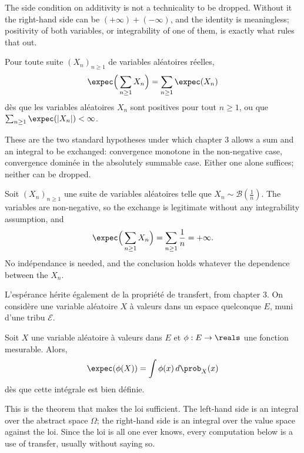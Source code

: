 The side condition on additivity is not a technicality to be dropped. Without it
the right-hand side can be $(+\infty) + (-\infty)$, and the identity is
meaningless; positivity of both variables, or integrability of one of them, is
exactly what rules that out.

\begin{prop}
  Pour toute suite $(X_{n})_{n \geq 1}$ de variables aléatoires réelles,
  \[
    \expec\Big(\sum_{n \geq 1} X_{n}\Big) = \sum_{n \geq 1} \expec(X_{n})
  \]
  dès que les variables aléatoires $X_{n}$ sont positives pour tout $n \geq 1$,
  ou que $\sum_{n \geq 1} \expec(|X_{n}|) < \infty$.
\end{prop}

\begin{remark}
  These are the two standard hypotheses under which chapter 3 allows a sum and an
  integral to be exchanged: convergence monotone in the non-negative case,
  convergence dominée in the absolutely summable case. Either one alone
  suffices; neither can be dropped.
\end{remark}

\begin{example}
  Soit $(X_{n})_{n \geq 1}$ une suite de variables aléatoires telle que
  $X_{n} \sim \mathcal{B}(\tfrac1n)$. The variables are non-negative, so the
  exchange is legitimate without any integrability assumption, and
  \[
    \expec\Big(\sum_{n \geq 1} X_{n}\Big)
      = \sum_{n \geq 1} \frac{1}{n} = +\infty .
  \]
  No indépendance is needed, and the conclusion holds whatever the dependence
  between the $X_{n}$.
\end{example}

L'espérance hérite également de la propriété de transfert, from chapter 3. On
considère une variable aléatoire $X$ à valeurs dans un espace quelconque $E$,
muni d'une tribu $\mathcal{E}$.

\begin{theorem}[Transfert]
  Soit $X$ une variable aléatoire à valeurs dans $E$ et $\phi : E \to \reals$ une
  fonction mesurable. Alors,
  \[
    \expec(\phi(X)) = \int \phi(x)\,d\prob_{X}(x)
  \]
  dès que cette intégrale est bien définie.
\end{theorem}

This is the theorem that makes the loi sufficient. The left-hand side is an
integral over the abstract space $\Omega$; the right-hand side is an integral over
the value space against the loi. Since the loi is all one ever knows, every
computation below is a use of transfer, usually without saying so.


